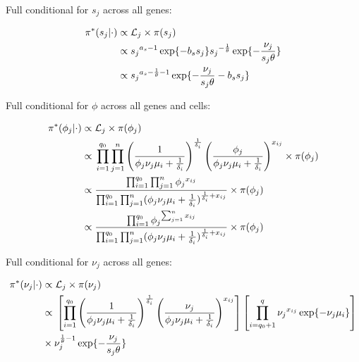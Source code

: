 Full conditional for $s_j$ across all genes:
\begin{fleqn}
\begin{align*}
\pi^*(s_j|\cdot)&\propto{}\mathcal{L}_j\times\pi(s_j)\\
&\propto{}s_j{}^{a_s-1}\exp\lbrace-b_ss_j\rbrace{}s_j{}^{-\frac{1}{\theta}}\exp\lbrace-\frac{\nu_j}{s_j\theta}\rbrace\\
&\propto{}s_j{}^{a_s-\frac{1}{\theta}-1}\exp\lbrace-\frac{\nu_j}{s_j\theta}-b_ss_j\rbrace
\end{align*}
\end{fleqn}

Full conditional for $\phi$ across all genes and cells:
\begin{fleqn}
\begin{align*}
\pi^*(\phi_j|\cdot)&\propto{}\mathcal{L}_j\times\pi(\phi_j)\\
&\propto{}\prod_{i=1}^{q_0}\prod_{j=1}^{n}\left(\frac{1}{\phi_j\nu_j\mu_i+\frac{1}{\delta_i}}\right)^\frac{1}{\delta_i}\left(\frac{\phi_j}{\phi_j\nu_j\mu_i+\frac{1}{\delta_i}}\right)^{x_{ij}}\times{}\pi(\phi_j)\\
&\propto{}\frac{\prod_{i=1}^{q_0}\prod_{j=1}^{n}\phi_j{}^{x_{ij}}}{\prod_{i=1}^{q_0}\prod_{j=1}^{n}(\phi_j\nu_j\mu_i+\frac{1}{\delta_i})^{\frac{1}{\delta_i}+x_{ij}}}\times{}\pi(\phi_j)\\
&\propto{}\frac{\prod_{i=1}^{q_0}\phi_j{}^{\sum_{j=1}^nx_{ij}}}{\prod_{i=1}^{q_0}\prod_{j=1}^{n}(\phi_j\nu_j\mu_i+\frac{1}{\delta_i})^{\frac{1}{\delta_i}+x_{ij}}}\times{}\pi(\phi_j)
\end{align*}
\end{fleqn}

Full conditional for $\nu_j$ across all genes:
\begin{fleqn}
\begin{align*}
\pi^*(\nu_j|\cdot)&\propto{}\mathcal{L}_j\times\pi(\nu_j)\\
&\propto{}\left[\prod_{i=1}^{q_0}\left(\frac{1}{\phi_j\nu_j\mu_i+\frac{1}{\delta_i}}\right)^\frac{1}{\delta_i}\left(\frac{\nu_j}{\phi_j\nu_j\mu_i+\frac{1}{\delta_i}}\right)^{x_{ij}}\right]\left[\prod_{i=q_0+1}^{q}\nu_j{}^{x_{ij}}\exp\lbrace-\nu_j\mu_i\rbrace\right]\\
&\times{}\nu_j^{\frac{1}{\theta}-1}\exp\lbrace-\frac{\nu_j}{s_j\theta}\rbrace
\end{align*}
\end{fleqn}

